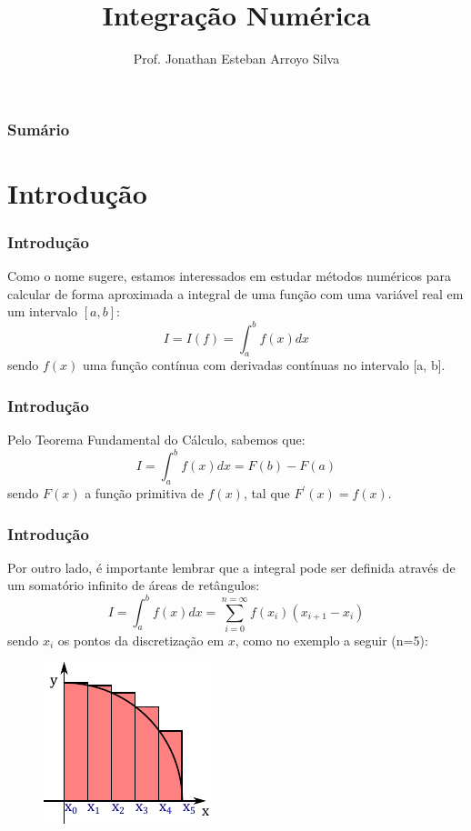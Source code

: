 \documentclass{beamer}
\title{Integração Numérica}
\author
{
	Prof. Jonathan Esteban Arroyo Silva	
}
\institute
{
	Departamento de Ciência da Computação\\
	Universidade Federal de São João del-Rei\\
	\texttt{silva.jea@ufsj.edu.br}
}
\date{}
\theoremstyle{mystyle}
\begin{document}
	
\begin{frame}[plain]
    \maketitle
\end{frame}

\begin{frame}[plain]
	\frametitle{Sumário}
	\tableofcontents
\end{frame}

\section{Introdução}
	\begin{frame}
		\frametitle{Introdução}	
		Como o nome sugere, estamos interessados em estudar métodos numéricos para calcular de forma aproximada a integral de uma função com uma variável real em um intervalo $ [a, b] $:
		\begin{equation*}
			I = I(f) = \int_{a}^{b} f(x) dx
		\end{equation*}
		sendo $ f (x) $ uma função contínua com derivadas contínuas no intervalo [a, b].
	\end{frame}

	\begin{frame}
		\frametitle{Introdução}	
		Pelo Teorema Fundamental do Cálculo, sabemos que:
		\begin{equation*}
			I = \int_{a}^{b} f(x) dx = F(b) - F(a)
		\end{equation*}
		sendo $ F (x) $ a função primitiva de $ f (x) $, tal que $ F ^{\prime}(x) = f (x) $.
	\end{frame}

	\begin{frame}
		\frametitle{Introdução}	
		Por outro lado, é importante lembrar que a integral pode ser definida através de um somatório infinito de áreas de retângulos:
		\begin{equation*}
			I = \int_{a}^{b} f(x) dx = \sum_{i = 0}^{n = \infty} f(x_{i})(x_{i+1} - x_{i})
		\end{equation*}
		sendo $ x_{i} $ os pontos da discretização em $ x $, como no exemplo a seguir (n=5):
		\begin{figure}
			\centering
			\includegraphics[width=0.4\linewidth]{Figuras/grafico_01}
			\label{fig:grafico01}
		\end{figure}
	\end{frame}
	
\end{document}
